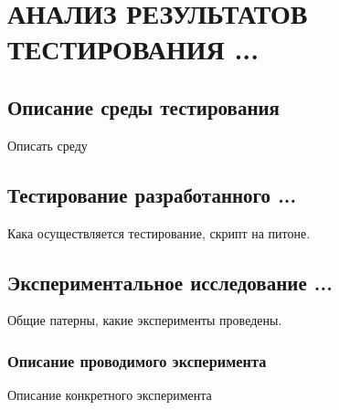 \chapter[Анализ результатов тестирования ...]
{АНАЛИЗ РЕЗУЛЬТАТОВ ТЕСТИРОВАНИЯ ...}

\section{Описание среды тестирования}\par
\hspace*{12.5 mm}Описать среду

\section{Тестирование разработанного ...}\par
\hspace*{12.5 mm}Кака осуществляется тестирование, скрипт на питоне.

\section{Экспериментальное исследование ...}\par
\hspace*{12.5 mm}Общие патерны, какие эксперименты проведены.

\subsection{Описание проводимого эксперимента}\par
\hspace*{12.5 mm}Описание конкретного эксперимента

